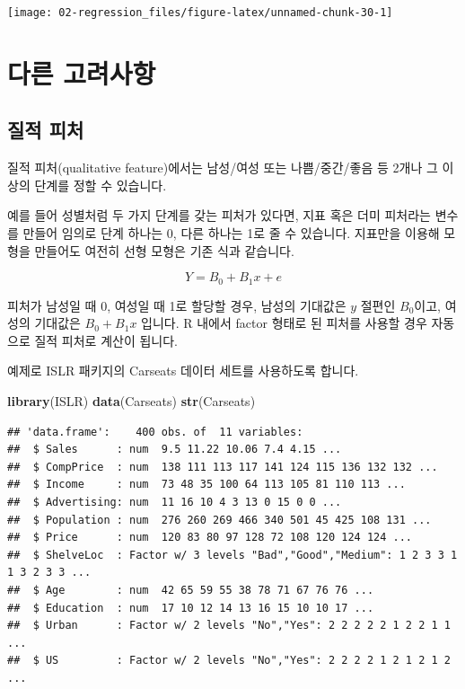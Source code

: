 \documentclass[12pt,]{book}
\newenvironment{Shaded}{\begin{snugshade}}{\end{snugshade}}
\newcommand{\KeywordTok}[1]{\textcolor[rgb]{0.13,0.29,0.53}{\textbf{#1}}}
\newcommand{\NormalTok}[1]{#1}
\begin{document}
\begin{center}\texttt{[image: 02-regression\_files/figure-latex/unnamed-chunk-30-1]} \end{center}

\hypertarget{uxb2e4uxb978-uxace0uxb824uxc0acuxd56d}{%
\section{다른 고려사항}\label{uxb2e4uxb978-uxace0uxb824uxc0acuxd56d}}

\hypertarget{uxc9c8uxc801-uxd53cuxcc98}{%
\subsection{질적 피처}\label{uxc9c8uxc801-uxd53cuxcc98}}

질적 피처(qualitative feature)에서는 남성/여성 또는 나쁨/중간/좋음 등 2개나 그 이상의 단계를 정할 수 있습니다.

예를 들어 성별처럼 두 가지 단계를 갖는 피처가 있다면, 지표 혹은 더미 피처라는 변수를 만들어 임의로 단계 하나는 0, 다른 하나는 1로 줄 수 있습니다. 지표만을 이용해 모형을 만들어도 여전히 선형 모형은 기존 식과 같습니다.

\[Y = B_0 + B_1x + e\]

피처가 남성일 때 0, 여성일 때 1로 할당할 경우, 남성의 기대값은 \(y\) 절편인 \(B_0\)이고, 여성의 기대값은 \(B_0 + B_1x\) 입니다. R 내에서 factor 형태로 된 피처를 사용할 경우 자동으로 질적 피처로 계산이 됩니다.

예제로 ISLR 패키지의 Carseats 데이터 세트를 사용하도록 합니다.

\begin{Shaded}
\begin{Highlighting}[]
\KeywordTok{library}\NormalTok{(ISLR)}
\KeywordTok{data}\NormalTok{(Carseats)}
\KeywordTok{str}\NormalTok{(Carseats)}
\end{Highlighting}
\end{Shaded}

\begin{verbatim}
## 'data.frame':    400 obs. of  11 variables:
##  $ Sales      : num  9.5 11.22 10.06 7.4 4.15 ...
##  $ CompPrice  : num  138 111 113 117 141 124 115 136 132 132 ...
##  $ Income     : num  73 48 35 100 64 113 105 81 110 113 ...
##  $ Advertising: num  11 16 10 4 3 13 0 15 0 0 ...
##  $ Population : num  276 260 269 466 340 501 45 425 108 131 ...
##  $ Price      : num  120 83 80 97 128 72 108 120 124 124 ...
##  $ ShelveLoc  : Factor w/ 3 levels "Bad","Good","Medium": 1 2 3 3 1 1 3 2 3 3 ...
##  $ Age        : num  42 65 59 55 38 78 71 67 76 76 ...
##  $ Education  : num  17 10 12 14 13 16 15 10 10 17 ...
##  $ Urban      : Factor w/ 2 levels "No","Yes": 2 2 2 2 2 1 2 2 1 1 ...
##  $ US         : Factor w/ 2 levels "No","Yes": 2 2 2 2 1 2 1 2 1 2 ...
\end{verbatim}
\end{document}
